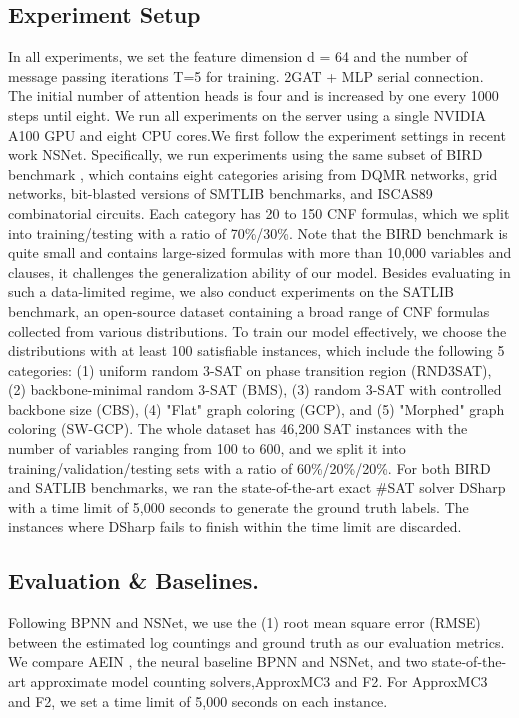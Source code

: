\subsection{Experiment Setup}
In all experiments, we set the feature dimension d = 64 and the number of message passing iterations 
T=5 for training. 2GAT + MLP serial connection. The initial number of attention heads is four and is 
increased by one every 1000 steps until eight. We run all experiments on the server using a single 
NVIDIA A100 GPU and eight CPU cores.We first follow the experiment settings in recent work NSNet. 
Specifically, we run experiments using the same subset of BIRD benchmark\cite{DBLP:conf/aaai/SoosM19} , 
which contains eight categories arising from DQMR networks, grid networks, bit-blasted versions of 
SMTLIB benchmarks, and ISCAS89 combinatorial circuits. Each category has 20 to 150 CNF formulas, 
which we split into training/testing with a ratio of 70\%/30\%. Note that the BIRD benchmark is quite 
small and contains large-sized formulas with more than 10,000 variables and clauses, it challenges the 
generalization ability of our model. Besides evaluating in such a data-limited regime, we also conduct 
experiments on the SATLIB benchmark, an open-source dataset containing a broad range of CNF formulas 
collected from various distributions. To train our model effectively, we choose the distributions with 
at least 100 satisfiable instances, which include the following 5 categories: (1) uniform random 3-SAT 
on phase transition region (RND3SAT), (2) backbone-minimal random 3-SAT (BMS), (3) random 3-SAT with 
controlled backbone size (CBS), (4) "Flat" graph coloring (GCP), and (5) "Morphed" graph coloring (SW-GCP). 
The whole dataset has 46,200 SAT instances with the number of variables ranging from 100 to 600, and we 
split it into training/validation/testing sets with a ratio of 60\%/20\%/20\%. For both BIRD and SATLIB 
benchmarks, we ran the state-of-the-art exact \#SAT solver DSharp\cite{DBLP:conf/ai/MuiseMBH12} with a 
time limit of 5,000 seconds to generate the ground truth labels. The instances where DSharp fails 
to finish within the time limit are discarded.

\subsection{Evaluation \& Baselines.}
Following BPNN and NSNet, we use the (1) root mean square error (RMSE) between the estimated log 
countings and ground truth as our evaluation metrics. We compare AEIN , the neural baseline BPNN and 
NSNet, and two state-of-the-art approximate model counting solvers,ApproxMC3 \cite{DBLP:conf/aaai/SoosM19} 
and F2\cite{DBLP:conf/sat/AchlioptasHT18a}. For ApproxMC3 and F2, we set a time limit of 5,000 seconds 
on each instance.

